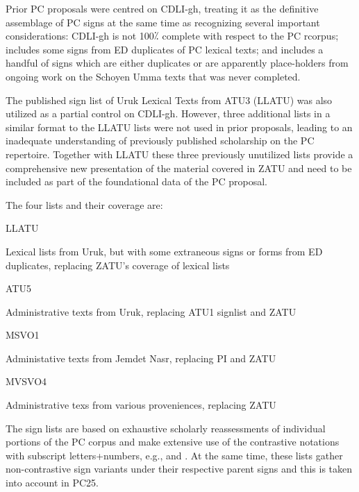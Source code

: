 \par Prior PC proposals were centred on CDLI-gh, treating it as
      the definitive assemblage of PC signs at the same time as
      recognizing several important considerations: CDLI-gh is not
      100⁒ complete with respect to the PC rcorpus; includes some
      signs from ED duplicates of PC lexical texts; and includes a
      handful of signs which are either duplicates or are apparently
      place-holders from ongoing work on the Schoyen Umma texts that
      was never completed.


\par The published sign list of Uruk Lexical Texts from ATU3
      (LLATU) was also utilized as a partial control on
      CDLI-gh. However, three additional lists in a similar format to
      the LLATU lists were not used in prior proposals, leading to an
      inadequate understanding of previously published scholarship on
      the PC repertoire.  Together with LLATU these three previously
      unutilized lists provide a comprehensive new presentation of the
      material covered in ZATU and need to be included as part of the
      foundational data of the PC proposal.


\par The four lists and their coverage are:

\Hdl\Hdt{}LLATU

{}Lexical lists from Uruk, but with some extraneous signs or
	forms from ED duplicates, replacing ZATU's coverage of lexical
	lists

\Hdt{}ATU5

{}Administrative texts from Uruk, replacing ATU1 signlist and ZATU

\Hdt{}MSVO1

{}Administative texts from Jemdet Nasr, replacing PI and ZATU

\Hdt{}MVSVO4

{}Administrative texs from various proveniences, replacing ZATU

\Henddl

\par The sign lists are based on exhaustive scholarly
      reassessments of individual portions of the PC corpus and make
      extensive use of the contrastive notations with subscript
      letters+numbers, e.g.,  and
      .  At the same time, these lists
      gather non-contrastive sign variants under their respective
      parent signs and this is taken into account in PC25.


